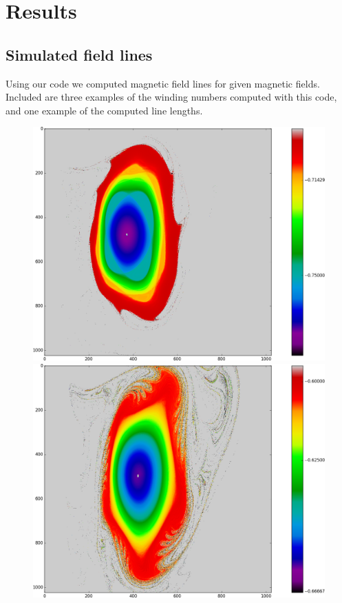 \documentclass{article}
\begin{document}
\section{Results}
\subsection{Simulated field lines}
Using our code we computed magnetic field lines for given magnetic fields. Included are three examples of the winding numbers computed with this code, and one example of the computed line lengths.


\begin{figure}[!htb]
  \includegraphics[width=\linewidth]{Figures/Rings_Papertwist_twist1_82_steps32k.png}
\endminipage\hfill
{}
  \includegraphics[width=\linewidth]{Figures/Rings_Papertwist_twist1_125_steps32k.png}

\end{figure}
\end{document}
